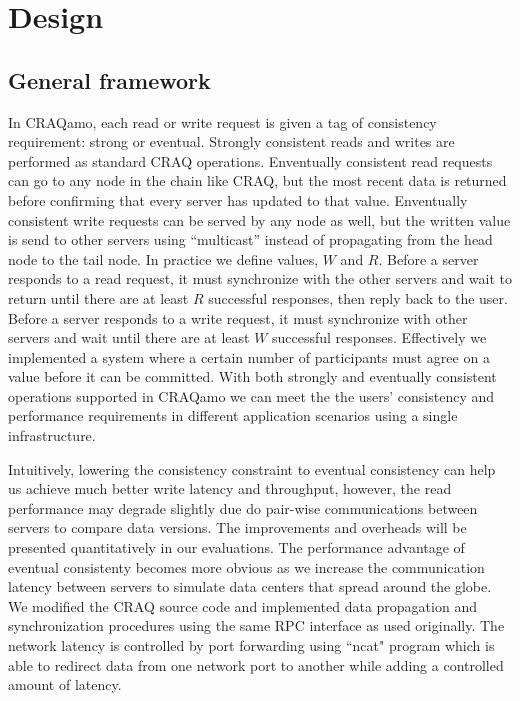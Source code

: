 \section{Design}
\label{sec:design}

\subsection{General framework}
In CRAQamo, each read or write request is given a tag of consistency requirement: strong or eventual. Strongly consistent reads and writes are performed as standard CRAQ operations. Enventually consistent read requests can go to any node in the chain like CRAQ, but the most recent data is returned before confirming that every server has updated to that value. Enventually consistent write requests can be served by any node as well, but the written value is send to other servers using ``multicast'' instead of propagating from the head node to the tail node. In practice we define values, $W$ and $R$. Before a server responds to a read request, it must synchronize with the other servers and wait to return until there are at least $R$ successful responses, then reply back to the user.  Before a server responds to a write request, it must synchronize with other servers and wait until there are at least $W$ successful responses. Effectively we implemented a system where a certain number of participants must agree on a value before it can be committed. With both strongly and eventually consistent operations supported in CRAQamo we can meet the the users' consistency and performance requirements in different application scenarios using a single infrastructure. 

Intuitively, lowering the consistency constraint to eventual consistency can help us achieve much better write latency and throughput, however, the read performance may degrade slightly due do pair-wise communications between servers to compare data versions. The improvements and overheads will be presented quantitatively in our evaluations. The performance advantage of eventual consistenty becomes more obvious as we increase the communication latency between servers to simulate data centers that spread around the globe. We modified the CRAQ source code and implemented data propagation and synchronization procedures using the same RPC interface as used originally. The network latency is controlled by port forwarding using ``ncat" program which is able to redirect data from one network port to another while adding a controlled amount of latency.

